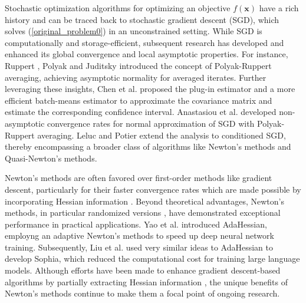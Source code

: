 \documentclass[aos]{imsart}
\numberwithin{equation}{section}
\theoremstyle{plain}
\begin{document}
Stochastic optimization algorithms for optimizing an objective $f(\bm{x})$ have a rich history and can be traced back to stochastic gradient descent (SGD), which solves (\ref{original_problem0}) in an unconstrained setting. 
While SGD is computationally and storage-efficient, subsequent research has developed and enhanced its global convergence and local asymptotic properties.
For instance, Ruppert \cite{ruppert1988efficient}, Polyak and Juditsky\cite{polyak1992acceleration} introduced the concept of Polyak-Ruppert averaging, achieving asymptotic normality for averaged iterates.
Further leveraging these insights, Chen et al. \cite{chen2020statistical} proposed the plug-in estimator and a more efficient batch-means estimator to approximate the covariance matrix and estimate the corresponding confidence interval. 
Anastasiou et al. \cite{anastasiou2019normal} developed non-asymptotic convergence rates for normal approximation of SGD with Polyak-Ruppert averaging. 
Leluc and Potier \cite{leluc2020asymptotic} extend the analysis to conditioned SGD, thereby encompassing a broader class of algorithms like Newton's methods and Quasi-Newton's methods.


Newton's methods are often favored over first-order methods like gradient descent, particularly for their faster convergence rates which are made possible by incorporating Hessian information \cite{jorge2006numerical, na2022hessian, yue2019quadratic}.
Beyond theoretical advantages, Newton's methods, in particular randomized versions \cite{fred_SSN_JRNL,XRM17_theory_TR,XRM17_empirical_TR,YXRM18_TR}, have demonstrated exceptional performance in practical applications. 
Yao et al. \cite{yao2021adahessian} introduced AdaHessian, employng an adaptive Newton's methods to speed up deep neural network training. 
Subsequently, Liu et al. \cite{liu2023sophia} used very similar ideas to AdaHessian to develop Sophia, which reduced the computational cost for training large language models. 
Although efforts have been made to enhance gradient descent-based algorithms by partially extracting Hessian information \cite{carmon2017convex, carmon2018accelerated, allen2018make}, the unique benefits of Newton's methods continue to make them a focal point of ongoing research.
\end{document}
